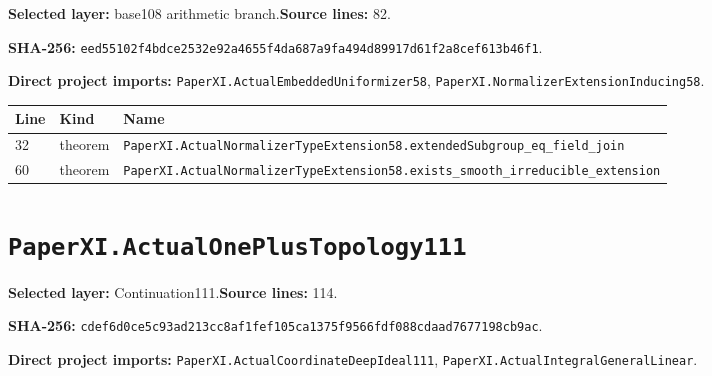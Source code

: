 \documentclass[10pt,oneside]{book}
\begin{document}
\textbf{Selected layer:} base108 arithmetic branch.\quad\textbf{Source lines:} 82.\par\textbf{SHA-256:} {\scriptsize\nolinkurl{eed55102f4bdce2532e92a4655f4da687a9fa494d89917d61f2a8cef613b46f1}}.


\textbf{Direct project imports:} \nolinkurl{PaperXI.ActualEmbeddedUniformizer58}, \nolinkurl{PaperXI.NormalizerExtensionInducing58}.

\begin{longtable}{@{}p{}p{}p{}@{}}\toprule Line&Kind&Name\\\midrule\endhead

32&theorem&\nolinkurl{PaperXI.ActualNormalizerTypeExtension58.extendedSubgroup_eq_field_join}\\

60&theorem&\nolinkurl{PaperXI.ActualNormalizerTypeExtension58.exists_smooth_irreducible_extension}\\

\bottomrule\end{longtable}

\section{\texorpdfstring{\nolinkurl{PaperXI.ActualOnePlusTopology111}}{PaperXI.ActualOnePlusTopology111}}\label{module:PaperXI.ActualOnePlusTopology111}

\textbf{Selected layer:} Continuation111.\quad\textbf{Source lines:} 114.\par\textbf{SHA-256:} {\scriptsize\nolinkurl{cdef6d0ce5c93ad213cc8af1fef105ca1375f9566fdf088cdaad7677198cb9ac}}.


\textbf{Direct project imports:} \nolinkurl{PaperXI.ActualCoordinateDeepIdeal111}, \nolinkurl{PaperXI.ActualIntegralGeneralLinear}.
\end{document}
